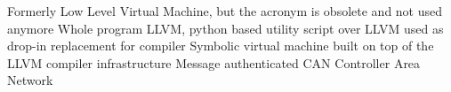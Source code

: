   {Formerly Low Level Virtual Machine, but the acronym
               is obsolete and not used anymore}
 {Whole program LLVM, python based utility script over LLVM
               used as drop-in replacement for compiler}
  {Symbolic virtual machine built on top of the LLVM compiler
               infrastructure}
 {Message authenticated CAN}
 {Controller Area Network}
